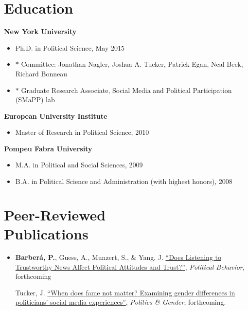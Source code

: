 \documentclass[margin,line,11pt]{resume}
\begin{document}
\begin{resume}
    \section{\mysidestyle Education}
\textbf{New York University}
\begin{itemize}
\item[] Ph.D. in Political Science, May 2015
\vspace{-.15cm}
\item[] $\ast$ Committee: Jonathan Nagler, Joshua A. Tucker, Patrick Egan, Neal Beck, Richard Bonneau
\vspace{-.15cm}
\item[] $\ast$  Graduate Research Associate, Social Media and Political Participation (SMaPP) lab
\end{itemize}
\vspace{-.30cm}
\textbf{European University Institute} 
\begin{itemize}
\item[] Master of Research in Political Science, 2010
\end{itemize}
\vspace{-.30cm}
\textbf{Pompeu Fabra University} 
\begin{itemize}
\item[] M.A. in Political and Social Sciences, 2009
\vspace{-.15cm}
\item[] B.A. in Political Science and Administration (with highest honors), 2008 
\end{itemize}

    \section{\mysidestyle Peer-Reviewed\\Publications}
\vspace{.15cm}    
\begin{itemize}[leftmargin=5.5mm]

\item[39.] \textbf{Barber\'{a}, P.}, Guess, A., Munzert, S., \& Yang, J. \href{https://link.springer.com/article/10.1007/s11109-026-10193-0}{``Does Listening to Trustworthy News Affect Political Attitudes and Trust?''}, \textit{Political Behavior}, forthcoming

Tucker, J. \href{https://www.cambridge.org/core/journals/politics-and-gender/article/when-does-fame-not-matter-examining-gender-differences-in-politicians-social-media-experiences/78BB8D1D35DD19124167E06BF47951F3}{``When does fame not matter? Examining gender differences in politicians' social media experiences''}, \textit{Politics \& Gender}, forthcoming.



\end{itemize}
\end{resume}
\end{document}
